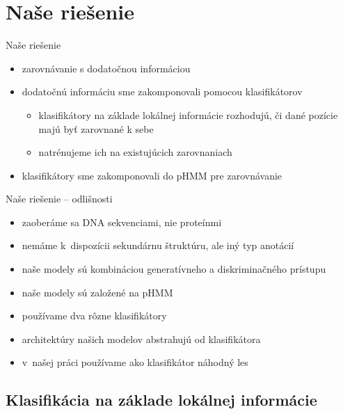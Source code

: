 \documentclass[xcolor=dvipsnames, compress, 12pt]{beamer}
\theoremstyle{definition}
\begin{document}
\section{Naše riešenie}
\begin{frame}{Naše riešenie}
  \begin{itemize}
    \item zarovnávanie s dodatočnou informáciou
    \item dodatočnú informáciu sme zakomponovali pomocou klasifikátorov
    \begin{itemize}
      \item klasifikátory na základe lokálnej informácie rozhodujú, či dané pozície majú byť zarovnané k sebe
      \item natrénujeme ich na existujúcich zarovnaniach
    \end{itemize}
    \item klasifikátory sme zakomponovali do pHMM pre zarovnávanie
  \end{itemize}
\end{frame}

\begin{frame}{Naše riešenie -- odlišnosti}
  \begin{itemize}
    \item zaoberáme sa DNA sekvenciami, nie proteínmi
    \item nemáme k~dispozícii sekundárnu štruktúru, ale iný typ anotácií
    \item naše modely sú kombináciou generatívneho a diskriminačného prístupu
    \item naše modely sú založené na pHMM
    \item používame dva rôzne klasifikátory
    \item architektúry našich modelov abstrahujú od klasifikátora
    \item v~našej práci používame ako klasifikátor náhodný les
  \end{itemize}
\end{frame}

\subsection{Klasifikácia na základe lokálnej informácie}
\end{document}
